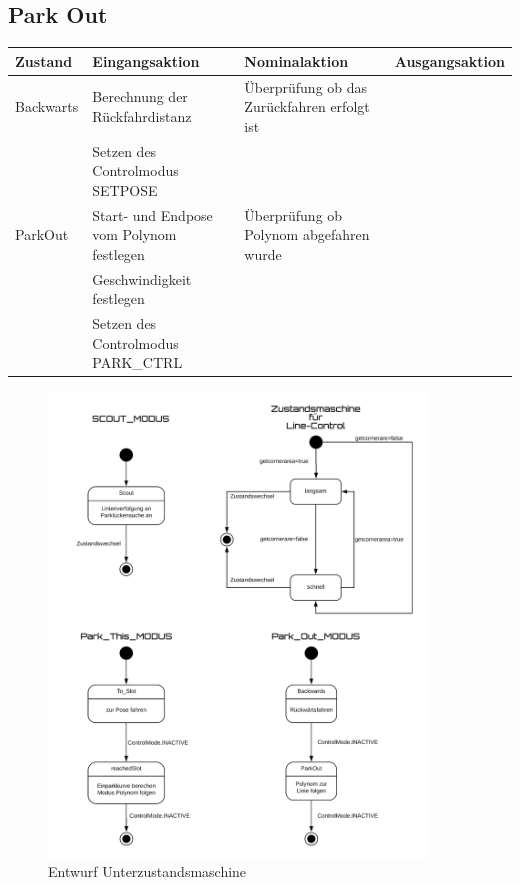 \subsection{Park Out}

\begin{tabular}{|p{1.7cm}|p{4cm}|p{4cm}|p{3cm}|}
	\hline 
	Zustand & Eingangsaktion & Nominalaktion & Ausgangsaktion \\ 
	\hline 
	Backwarts & Berechnung der Rückfahrdistanz & Überprüfung ob das Zurückfahren erfolgt ist &  \\ 
	\hline
	 & Setzen des Controlmodus \glqq SETPOSE\grqq & &\\ 
	\hline
	ParkOut & Start- und Endpose vom Polynom festlegen  & Überprüfung ob Polynom abgefahren wurde  &  \\ 
	\hline 
	 & Geschwindigkeit festlegen  &  &  \\ 
	\hline  
	& Setzen des Controlmodus \glqq PARK\_CTRL\grqq & &  \\ 
	\hline
 
\end{tabular} 

\begin{figure}[h]
	\centering
	\includegraphics[width=0.9\textwidth]{Subzustandsmaschine}
	\caption{Entwurf Unterzustandsmaschine}
	\label{img:grafik-Unterzustandsautomat}
\end{figure}
